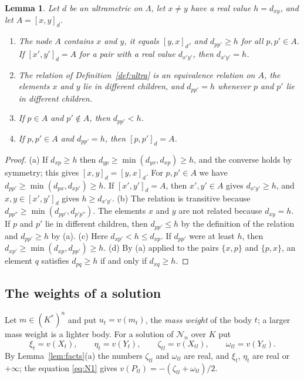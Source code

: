 \documentclass[11pt]{amsart}
\newtheorem{lemma}[theorem]{Lemma}
\theoremstyle{definition}
\theoremstyle{remark}
\numberwithin{equation}{section}
\newcommand{\cN}{\mathcal{N}}
\newcommand{\nd}[2]{[#1]_{#2}}
\begin{document}
\begin{lemma}\label{lem:tree}
Let $d$ be an ultrametric on $\Lambda$, let $x \ne y$ have a real value $h = d_{xy}$, and let
$A = \nd{x, y}{d}$.
\begin{enumerate}
\item[(a)] The node $A$ contains $x$ and $y$, it equals $\nd{y, x}{d}$, and $d_{pp'} \ge h$ for all
$p, p' \in A$. If $\nd{x', y'}{d} = A$ for a pair with a real value $d_{x'y'}$, then $d_{x'y'} = h$.
\item[(b)] The relation of Definition~\ref{def:ultra} is an equivalence relation on $A$, the elements $x$
and $y$ lie in different children, and $d_{pp'} = h$ whenever $p$ and $p'$ lie in different children.
\item[(c)] If $p \in A$ and $p' \notin A$, then $d_{pp'} < h$.
\item[(d)] If $p, p' \in A$ and $d_{pp'} = h$, then $\nd{p, p'}{d} = A$.
\end{enumerate}
\end{lemma}

\begin{proof}
(a) If $d_{xp} \ge h$ then $d_{yp} \ge \min(d_{yx}, d_{xp}) \ge h$, and the converse holds by symmetry;
this gives $\nd{x, y}{d} = \nd{y, x}{d}$. For $p, p' \in A$ we have
$d_{pp'} \ge \min(d_{px}, d_{xp'}) \ge h$. If $\nd{x', y'}{d} = A$, then $x', y' \in A$ gives
$d_{x'y'} \ge h$, and $x, y \in \nd{x', y'}{d}$ gives $h \ge d_{x'y'}$. (b) The relation is transitive
because $d_{pp''} \ge \min(d_{pp'}, d_{p'p''})$. The elements $x$ and $y$ are not related because
$d_{xy} = h$. If $p$ and $p'$ lie in different children, then $d_{pp'} \le h$ by the definition of the
relation and $d_{pp'} \ge h$ by (a). (c) Here $d_{xp'} < h \le d_{xp}$. If $d_{pp'}$ were at least $h$,
then $d_{xp'} \ge \min(d_{xp}, d_{pp'}) \ge h$. (d) By (a) applied to the pairs $\{x, p\}$ and
$\{p, x\}$, an element $q$ satisfies $d_{pq} \ge h$ if and only if $d_{xq} \ge h$.
\end{proof}

\subsection{The weights of a solution} Let $m \in (K^{*})^n$ and put $u_t = v(m_t)$, the \emph{mass
weight} of the body $t$; a larger mass weight is a lighter body. For a solution of $\cN_n$ over $K$ put
\[
  \xi_t = v(X_t), \qquad \eta_t = v(Y_t), \qquad \zeta_{tl} = v(X_{tl}), \qquad \omega_{tl} = v(Y_{tl}).
\]
By Lemma~\ref{lem:facts}(a) the numbers $\zeta_{tl}$ and $\omega_{tl}$ are real, and $\xi_t$, $\eta_t$
are real or $+\infty$; the equation \eqref{eq:N1} gives $v(P_{tl}) = -(\zeta_{tl} + \omega_{tl})/2$.
\end{document}
